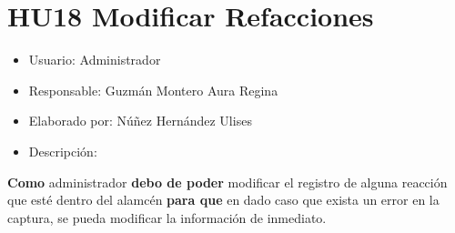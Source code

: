 \section{HU18 Modificar Refacciones}
\begin{itemize}
	\item Usuario: Administrador
	\item Responsable: Guzmán Montero Aura Regina
	\item Elaborado por: Núñez Hernández Ulises
	\item Descripción:\\
\end{itemize}

\textbf{Como} administrador \textbf{debo de poder} modificar el registro de alguna reacción que esté dentro del alamcén \textbf{para que} en dado caso que exista un error en la captura, se pueda modificar la información de inmediato. 